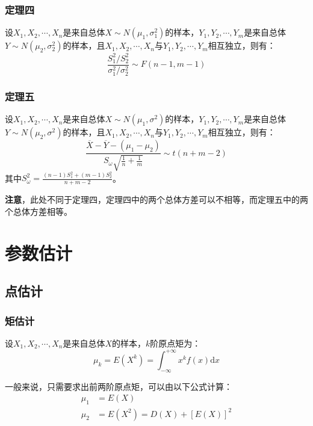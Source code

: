 \documentclass[a4paper,12pt]{ctexart}
\begin{document}
\subsubsection{定理四}

设$X_1,X_2,\cdots,X_n$是来自总体$X \sim N(\mu_1,\sigma_1^2)$的样本，$Y_1,Y_2,\cdots,Y_m$是来自总体$Y \sim N(\mu_2,\sigma_2^2)$的样本，且$X_1,X_2,\cdots,X_n$与$Y_1,Y_2,\cdots,Y_m$相互独立，则有：
\begin{equation*}
	\frac{S_1^2/S_2^2}{\sigma_1^2/\sigma_2^2} \sim F(n-1,m-1)
\end{equation*}

\subsubsection{定理五}

设$X_1,X_2,\cdots,X_n$是来自总体$X \sim N(\mu_1,\sigma^2)$的样本，$Y_1,Y_2,\cdots,Y_m$是来自总体$Y \sim N(\mu_2,\sigma^2)$的样本，且$X_1,X_2,\cdots,X_n$与$Y_1,Y_2,\cdots,Y_m$相互独立，则有：
\begin{equation*}
	\frac{\overline{X} - \overline{Y} - (\mu_1 - \mu_2)}{S_{\omega} \sqrt{\frac{1}{n} + \frac{1}{m}}} \sim t(n+m-2)
\end{equation*}
其中$S_{\omega}^2 = \frac{(n-1)S_1^2 + (m-1)S_2^2}{n+m-2}$。

\textbf{注意}，此处不同于定理四，定理四中的两个总体方差可以不相等，而定理五中的两个总体方差相等。

\section{参数估计}

\subsection{点估计}

\subsubsection{矩估计}

设$X_1,X_2,\cdots,X_n$是来自总体$X$的样本，$k$阶原点矩为：
\begin{equation*}
	\mu_k = E(X^k) = \int_{-\infty}^{+\infty}x^kf(x)\mathrm{d}x
\end{equation*}

一般来说，只需要求出前两阶原点矩，可以由以下公式计算：
\begin{align*}
	\mu_1 &= E(X) \\
	\mu_2 &= E(X^2) = D(X) + [E(X)]^2
\end{align*}
\end{document}
